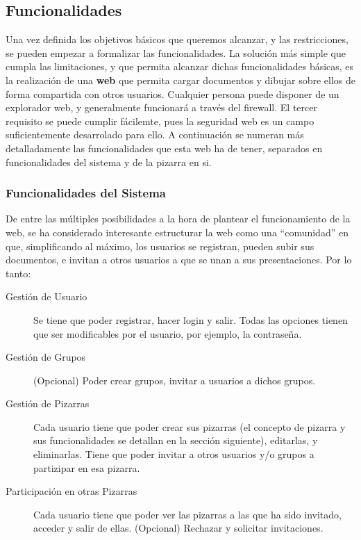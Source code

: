 \subsection{Funcionalidades}
Una vez definida los objetivos básicos que queremos alcanzar, y las restricciones, se pueden empezar a formalizar las funcionalidades. La solución más simple que cumpla las limitaciones, y que permita alcanzar dichas funcionalidades básicas, es la realización de una \textbf{web} que permita cargar documentos y dibujar sobre ellos de forma compartida con otros usuarios. Cualquier persona puede disponer de un explorador web, y generalmente funcionará a través del firewall. El tercer requisito se puede cumplir fácilemte, pues la seguridad web es un campo suficientemente desarrolado para ello. A continuación se numeran más detalladamente las funcionalidades que esta web ha de tener, separados en funcionalidades del sistema y de la pizarra en si.

\subsubsection{Funcionalidades del Sistema}
De entre las múltiples posibilidades a la hora de plantear el funcionamiento de la web, se ha considerado interesante estructurar la web como una ``comunidad'' en que, simplificando al máximo, los usuarios se registran, pueden subir sus documentos, e invitan a otros usuarios a que se unan a sus presentaciones. Por lo tanto:

\begin{description}
	\item[Gestión de Usuario] Se tiene que poder registrar, hacer login y salir. Todas las opciones tienen que ser modificables por el usuario, por ejemplo, la contraseña.
	\item[Gestión de Grupos] (Opcional) Poder crear grupos, invitar a usuarios a dichos grupos.
	\item[Gestión de Pizarras] Cada usuario tiene que poder crear sus pizarras (el concepto de pizarra y sus funcionalidades se detallan en la sección siguiente), editarlas, y eliminarlas. Tiene que poder invitar a otros usuarios y/o grupos a partizipar en esa pizarra.
	\item[Participación en otras Pizarras] Cada usuario tiene que poder ver las pizarras a las que ha sido invitado, acceder y salir de ellas. (Opcional) Rechazar y solicitar invitaciones.
\end{description}

